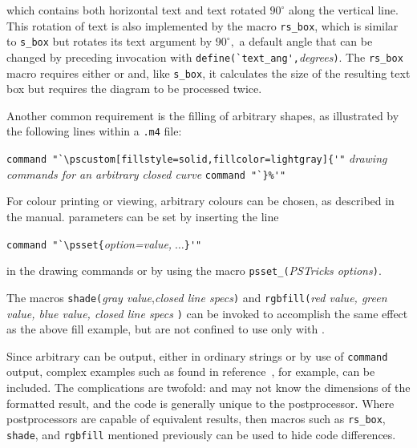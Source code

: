 {\small }

\noindent%
which contains both horizontal text and text rotated $90^\circ$ along the
vertical line.
This rotation of text is also implemented by the macro
{\tt rs\_box}, which is similar
to {\tt s\_box} but rotates its text argument by $90^\circ,$ a default angle
that can be changed by preceding invocation with
\verb|define(`text_ang',|{\sl degrees}{\tt )}.  The {\tt rs\_box} macro
requires either \PSTricks or \TPGF and, like {\tt s\_box}, it calculates the
size of the resulting text box but requires the diagram to be
processed twice.

Another common requirement is the filling of arbitrary shapes, as
illustrated by the following lines within a {\tt .m4} file:

\vspace{\parsep}
\noindent%
\verb|command "`\pscustom[fillstyle=solid,fillcolor=lightgray]{'"|
\hfill\break
{\sl drawing commands for an arbitrary closed curve}
\hfill\break
\verb|command "`}%'"|
\vspace{\parsep}

For colour printing or viewing, arbitrary
colours can be chosen, as described in the \PSTricks manual.
\PSTricks parameters can be set by inserting the line

\vspace{\parsep}
\noindent\verb|command "`\psset{|{\sl option=value,}$\;\ldots$\verb|}'"|
\vspace{\parsep}

\noindent%
in the drawing commands or by using the macro
{\tt psset\_(}{\sl PSTricks options}{\tt )}.

The macros
 {\tt shade(}{\sl gray value},{\sl closed line specs}{\tt )}
and
 {\tt rgbfill(}{\sl red value, green value, blue value, closed line specs}%
 {\tt )}
can be invoked to accomplish the same effect as the above fill example, but
are not confined to use only with \PSTricks.

Since arbitrary \latex can be output, either in ordinary strings or by
use of {\tt command} output, complex examples such as found in
reference~\cite{Girou94},
for example, can be included.  The complications
are twofold: \latex and \dpic may not know the dimensions of the formatted
result, and the code is generally unique to the postprocessor.
Where postprocessors are capable of equivalent results, then
macros such as {\tt rs\_box}, {\tt shade}, and {\tt rgbfill} mentioned
previously can be used to hide code differences.

